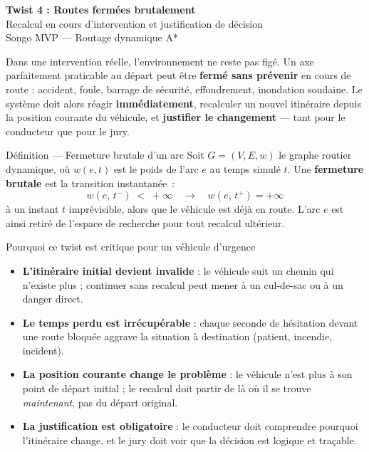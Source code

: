 \documentclass[12pt,a4paper]{article}
\begin{document}
\begin{center}
  {\LARGE\bfseries Twist 4 : Routes ferm\'ees brutalement}\\[6pt]
  {\large Recalcul en cours d'intervention et justification de d\'ecision}\\[3pt]
  {\small\color{gray} Songo MVP --- Routage dynamique A*}
\end{center}

\vspace{0.4cm}

\noindent
Dans une intervention r\'eelle, l'environnement ne reste pas fig\'e.
Un axe parfaitement praticable au d\'epart peut \^etre \textbf{ferm\'e sans pr\'evenir}
en cours de route : accident, foule, barrage de s\'ecurit\'e, effondrement, inondation soudaine.
Le syst\`eme doit alors r\'eagir \textbf{imm\'ediatement}, recalculer un nouvel
itin\'eraire depuis la position courante du v\'ehicule, et \textbf{justifier
le changement} --- tant pour le conducteur que pour le jury.

\bigskip

\begin{defbox}{D\'efinition --- Fermeture brutale d'un arc}
Soit $G = (V, E, w)$ le graphe routier dynamique, o\`u $w(e, t)$ est le poids
de l'arc $e$ au temps simul\'e $t$.
Une \textbf{fermeture brutale} est la transition instantan\'ee~:
\[
  w(e,\, t^-) \;<\; +\infty
  \quad\longrightarrow\quad
  w(e,\, t^+) = +\infty
\]
\`a un instant $t$ imprévisible, alors que le v\'ehicule est d\'ej\`a en route.
L'arc $e$ est ainsi retir\'e de l'espace de recherche pour tout recalcul ult\'erieur.
\end{defbox}

\bigskip

\begin{alertbox}{Pourquoi ce twist est critique pour un v\'ehicule d'urgence}
\begin{itemize}[leftmargin=1.5em, itemsep=4pt]
  \item \textbf{L'itin\'eraire initial devient invalide} : le v\'ehicule suit
        un chemin qui n'existe plus ; continuer sans recalcul peut mener
        \`a un cul-de-sac ou \`a un danger direct.
  \item \textbf{Le temps perdu est irr\'ecup\'erable} : chaque seconde de
        h\'esitation devant une route bloqu\'ee aggrave la situation
        \`a destination (patient, incendie, incident).
  \item \textbf{La position courante change le probl\`eme} : le v\'ehicule
        n'est plus \`a son point de d\'epart initial ; le recalcul doit partir
        de l\`a o\`u il se trouve \textit{maintenant}, pas du d\'epart original.
  \item \textbf{La justification est obligatoire} : le conducteur doit comprendre
        pourquoi l'itin\'eraire change, et le jury doit voir que la d\'ecision
        est logique et tra\c{c}able.
\end{itemize}
\end{alertbox}
\end{document}
